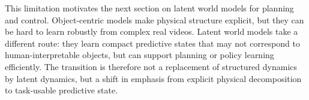 This limitation motivates the next section on latent world models for planning and control. Object-centric models make physical structure explicit, but they can be hard to learn robustly from complex real videos. Latent world models take a different route: they learn compact predictive states that may not correspond to human-interpretable objects, but can support planning or policy learning efficiently. The transition is therefore not a replacement of structured dynamics by latent dynamics, but a shift in emphasis from explicit physical decomposition to task-usable predictive state.
